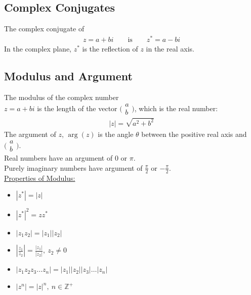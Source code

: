 \documentclass[10pt, a4paper, titlepage]{article}
\newcommand{\mbb}[1]{\mathbb{#1}}
\begin{document}
\begin{multicols*}{3}
	\subsection{Complex Conjugates}
	The complex conjugate of
	\begin{align}
		z=a+bi\qquad \text{is}\qquad z^*=a-bi
	\end{align}
	In the complex plane, $z^*$ is the reflection of $z$ in the real axis.

	\dotfill
	\subsection{Modulus and Argument}
	The modulus of the complex number \\$z=a+bi$ is the length of the vector $\big(\begin{smallmatrix}a\\ b\end{smallmatrix}\big)$, which is the real number:
	\begin{align}
		|z|=\sqrt{a^2+b^2}
	\end{align}
	The argument of $z$, $\arg({z})$ is the angle $\theta$ between the positive real axis and $\big(\begin{smallmatrix}a\\ b\end{smallmatrix}\big)$.\\
	Real numbers have an argument of 0 or $\pi$.\\
	Purely imaginary numbers have argument of $\frac{\pi}{2}$ or $-\frac{\pi}{2}$.\\

	\underline{Properties of Modulus:}
	\begin{itemize}
		\item $|z^*|=|z|$
		\item $|z^*|^2=zz^*$
		\item $|z_1z_2|=|z_1||z_2|$
		\item $\left|\frac{z_1}{z_2}\right|=\frac{|z_1|}{|z_2|},\ z_2\neq 0$
		\item $|z_1z_2z_3\dots z_n|=|z_1||z_2||z_3|\dots |z_n|$
		\item $|z^n|=|z|^n,\ n\in \mbb{Z}^+$
	\end{itemize}

	\dotfill

\end{multicols*}
\end{document}
